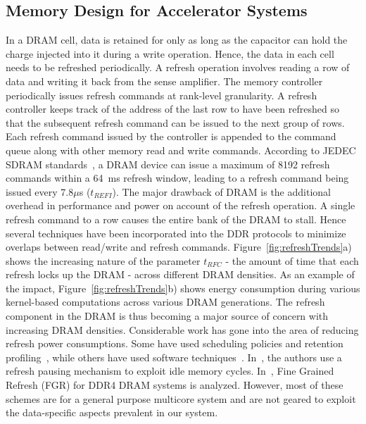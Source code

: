 \subsection{Memory Design for Accelerator Systems}

In a DRAM cell, data is retained for only as long as the capacitor can hold the charge injected into it during a write operation. Hence, the data in each cell needs to be refreshed periodically. A refresh operation involves reading a row of data and writing it back from the sense amplifier. The memory controller periodically issues refresh commands at rank-level granularity. A refresh controller keeps track of the address of the last row to have been refreshed so that the subsequent refresh command can be issued to the next group of rows. 
Each refresh command issued by the controller is appended to the command queue along with other memory read and write commands.  
According to JEDEC SDRAM standards~\cite{jedec-sdram-standards}, a DRAM device can issue a maximum of 8192 refresh commands within a 64~ms refresh window, leading to a refresh command being issued every 7.8$\mu$s ($t_{REFI}$). The major drawback of DRAM is the additional overhead in performance and power on account of the refresh operation. A single refresh command to a row causes the entire bank of the DRAM to stall. Hence several techniques have been incorporated into the DDR protocols to minimize overlaps between read/write and refresh commands. Figure~\ref{fig:refreshTrends}a) shows the increasing nature of the parameter $t_{RFC}$ - the amount of time that each refresh locks up the DRAM - across different DRAM densities. As an example of the impact, Figure~\ref{fig:refreshTrends}b) shows energy consumption during various kernel-based computations across various DRAM generations. The refresh component in the DRAM is thus becoming a major source of concern with increasing DRAM densities. 
Considerable work has gone into the area of reducing refresh power consumptions. Some have used scheduling policies and retention profiling~\cite{Stuecheli2010}, while others have used software techniques~\cite{Liu2012}. In~\cite{Nair2013}, the authors use a refresh pausing mechanism to exploit idle memory cycles. In~\cite{Mukundan2013}, Fine Grained Refresh (FGR) for DDR4 DRAM systems is analyzed. 
However, most of these schemes are for a general purpose multicore system and are not geared to exploit the data-specific aspects prevalent in our system. 

